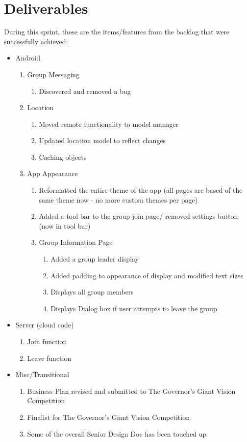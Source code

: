 \documentclass[11pt]{article}
\begin{document}
\section*{Deliverables}
During this sprint, these are the items/features from the backlog that were successfully achieved:
	\begin{itemize}
	\item Android
		\begin{enumerate}
		\item Group Messaging
			\begin{enumerate}
			\item Discovered and removed a bug
			\end{enumerate}
		\item Location
			\begin{enumerate}
			\item Moved remote functionality to model manager
			\item Updated location model to reflect changes
			\item Caching objects
			\end{enumerate}
		\item App Appearance
			\begin{enumerate}
			\item Reformatted the entire theme of the app (all pages are based of the same theme now - no more custom themes per page)
			\item Added a tool bar to the group join page/ removed settings button (now in tool bar)
			\item Group Information Page
				\begin{enumerate}
				\item Added a group leader display
				\item Added padding to appearance of display and modified text sizes
				\item Displays all group members
				\item Displays Dialog box if user attempts to leave the group
				\end{enumerate}
			\end{enumerate}
		\end{enumerate}

	\item Server (cloud code)
		\begin{enumerate}
			\item Join function
			\item Leave function
		\end{enumerate}
		
	\item Misc/Transitional
		\begin{enumerate}
			\item Business Plan revised and submitted to The Governor's Giant Vision Competition
			\item Finalist for The Governor's Giant Vision Competition
			\item Some of the overall Senior Design Doc has been touched up
		\end{enumerate}

	\end{itemize}
\end{document}
